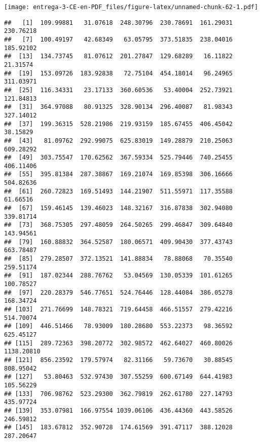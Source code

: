 \documentclass[
]{article}
\newenvironment{Shaded}{\begin{snugshade}}{\end{snugshade}}
\newcommand{\DataTypeTok}[1]{\textcolor[rgb]{0.13,0.29,0.53}{#1}}
\newcommand{\DecValTok}[1]{\textcolor[rgb]{0.00,0.00,0.81}{#1}}
\newcommand{\KeywordTok}[1]{\textcolor[rgb]{0.13,0.29,0.53}{\textbf{#1}}}
\newcommand{\NormalTok}[1]{#1}
\newcommand{\OperatorTok}[1]{\textcolor[rgb]{0.81,0.36,0.00}{\textbf{#1}}}
\newcommand{\StringTok}[1]{\textcolor[rgb]{0.31,0.60,0.02}{#1}}
\begin{document}
\texttt{[image: entrega-3-CE-en-PDF\_files/figure-latex/unnamed-chunk-62-1.pdf]}

\begin{Shaded}
\end{Shaded}

\begin{verbatim}
##   [1]  109.99881   31.07618  248.30796  230.78691  161.29031  230.76218
##   [7]  100.49197   42.68349   63.05795  373.51835  238.04016  185.92102
##  [13]  134.73745   81.07612  201.27847  129.68289   16.11822   21.31574
##  [19]  153.09726  183.92838   72.75104  454.18014   96.24965  311.03971
##  [25]  116.34331   23.17133  360.60536   53.40004  252.73921  121.84813
##  [31]  364.97088   80.91325  328.90134  296.40087   81.98343  327.14012
##  [37]  199.36315  528.21986  219.93159  185.67455  406.45042   38.15829
##  [43]   81.09762  292.99075  625.83019  149.28879  210.25063  609.28292
##  [49]  303.75547  170.62562  367.59334  525.79446  740.25455  406.11406
##  [55]  395.81384  287.38867  169.21074  169.85398  306.16666  504.82636
##  [61]  260.72823  169.51493  144.21907  511.55971  117.35588   61.66516
##  [67]  159.46145  139.46023  148.32167  316.87838  302.94080  339.81714
##  [73]  368.75305  297.48059  264.50265  299.46847  309.64840  143.94561
##  [79]  160.88832  364.52587  180.06571  409.90430  377.43743  663.78487
##  [85]  279.28507  372.13521  141.88834   78.88068   70.35540  259.51174
##  [91]  187.02344  288.76762   53.04569  130.05339  101.61265  100.78527
##  [97]  220.28379  546.77651  524.76446  128.44084  386.05278  168.34724
## [103]  271.76699  148.78321  719.64458  466.51557  279.42216  514.70074
## [109]  446.51466   78.93009  180.28680  553.22373   98.36592  625.45127
## [115]  289.72363  398.20772  302.98572  462.64027  460.80026 1138.20810
## [121]  856.23592  179.57974   82.31166   59.73670   30.88545  808.95042
## [127]   53.80463  532.97430  307.55259  600.67149  644.41983  105.56229
## [133]  706.98762  523.29300  362.79819  262.61780  227.14793  435.97724
## [139]  353.07981  166.97554 1039.06106  436.44360  443.58526  246.59812
## [145]  183.67812  352.90728  174.61569  391.47117  388.12028  287.20647

\end{verbatim}
\end{document}
